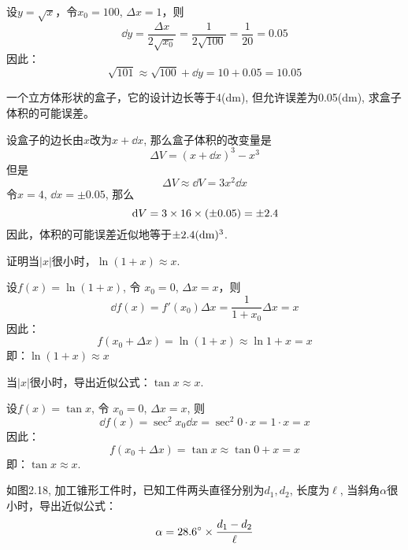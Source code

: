 \begin{solution}
设$y=\sqrt{x}$，令$x_0=100$, $\Delta x=1$，则
\[\dd y=\frac{\Delta x}{2\sqrt{x_0}}=\frac{1}{2\sqrt{100}}=\frac{1}{20}=0.05\]
因此：
\[\sqrt{101}\approx \sqrt{100}+\dd y=10+0.05=10.05\]
\end{solution}



\begin{example}
一个立方体形状的盒子，它的设计边长等于4(dm), 但允许误差为0.05(dm), 求盒子体积的可能误差。
\end{example}


\begin{solution}
设盒子的边长由$x$改为$x+\dd x$, 那么盒子体积的改变量是
\[\Delta V= (x+\dd x)^3-x^3\]
但是
\[\Delta V\approx \dd V=3x^2\dd x\]
令$x=4$, $\dd x=\pm 0.05$, 那么
\[\,{\rm d} V=3\times16\times (\pm 0. 05) =\pm 2.4\]
因此，体积的可能误差近似地等于$\pm 2.4({\rm dm})^3$.
\end{solution}

\begin{example}
    证明当$|x|$很小时，$\ln(1+x)\approx x$.
\end{example}

\begin{solution}
    设$f(x)=\ln(1+x)$, 令 $x_0=0$, $\Delta x=x$，则
\[\dd f (x) =f' (x_0) \Delta x=\frac{1}{1+x_0}\Delta x=x\]
因此：
\[f (x_0+\Delta x) =\ln (1+x) \approx \ln 1+x=x\]
即：$\ln(1+x)\approx x$
\end{solution}


\begin{example}
    当$|x|$很小时，导出近似公式：$\tan x\approx x$.
\end{example}


\begin{solution}
    设$f(x)=\tan x$, 令 $x_0=0$, $\Delta x=x$, 则
\[\dd f (x) =\sec^2x_0 \dd x=\sec^2 0\cdot x=1\cdot x=x\]
因此：
\[f (x_0+\Delta x) =\tan x\approx \tan 0+x=x\]
即：$\tan x\approx x$.
\end{solution}

\begin{example}
如图2.18, 加工锥形工件时，已知工件两头直径分别为$d_1,d_2$, 长度为$\ell$, 当斜角$\alpha$很小时，导出近似公式：
\[\alpha=28.6^{\circ}\times\dfrac{d_1-d_2}{\ell}\]
\end{example}

\begin{figure}[htp]
    \centering
{}  
    \caption{}
\end{figure}

